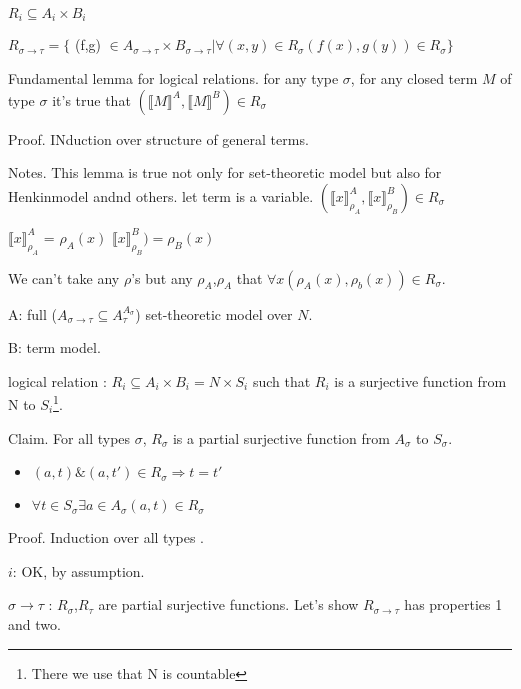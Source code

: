 \documentclass[a4paper,10pt]{book}
\newcommand{\sem}[2]{ \llbracket#1\rrbracket_{#2} }
\begin{document}
$R_i \subseteq A_i \times B_i$

$R_{\sigma \rightarrow  \tau} = \{$ (f,g) $\in A_{\sigma \rightarrow \tau} \times
B_{\sigma \rightarrow \tau} |
\forall (x,y) \in R_\sigma (f(x), g(y)) \in R_\sigma \}$

Fundamental lemma for logical relations.
for any type $\sigma$, for any closed term $M$ of type $\sigma$ it's true that 
$(\sem{M}{} ^A, \sem{M}{} ^B) \in R_\sigma$

Proof. INduction over structure of general terms.

Notes. This lemma is true not only for set-theoretic model but also for Henkinmodel andnd
others.
let term is a variable. $(\sem{x}{\rho_A}^A, \sem{x}{\rho_B}^B) \in R_\sigma$

$\sem{x}{\rho_A}^A$ = $\rho_A(x)$
$\sem{x}{\rho_B}^B) = \rho_B(x)$

We can't take any $\rho$'s but any $\rho_A$,$\rho_A$ that $\forall x (\rho_A(x), \rho_b(x)) \in R_\sigma$.


A: full ($A_{\sigma \rightarrow \tau} \subseteq A_{\tau}^{A_\sigma}$) set-theoretic model over $N$.

B: term model.

logical relation : $R_i \subseteq A_i \times B_i = N \times S_i$ such that $R_i$ is a surjective 
function from N to $S_i$\footnote{There we use that N is countable}.

Claim. For all types $\sigma$, $R_\sigma$ is a partial surjective function from $A_\sigma$ to $S_\sigma$.

\begin{itemize}
 \item $(a,t) \& (a,t') \in R_\sigma \Rightarrow t = t'$
 \item $\forall t \in S_\sigma \exists a  \in A_\sigma (a,t) \in R_\sigma$
\end{itemize}

Proof. Induction over all types .

$i$: OK, by assumption.

$\sigma \rightarrow \tau$ : $R_\sigma$,$R_\tau$ are partial surjective functions. Let's show 
$R_{\sigma \rightarrow \tau}$ has properties 1 and two.

\end{document}
